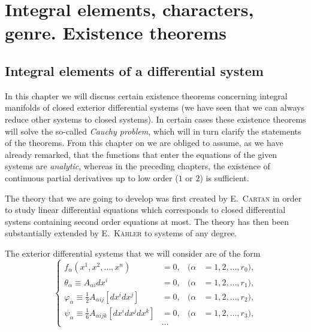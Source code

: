 \chapter{Integral elements, characters, genre. Existence theorems}
\label{cha:integr-elem-char}

\section{Integral elements of a differential system}
\label{sec:integr-elem-diff}

\fsec In this chapter we will discuss certain existence theorems concerning  integral manifolds of closed exterior differential systems (we have seen that we can always reduce other systems to closed systems). In certain cases these existence theorems will solve the so-called \emph{Cauchy problem}, which will in turn clarify the statements of the theorems. From this chapter on we are obliged to assume, as we have already remarked, that the functions that enter the equations of the given systems are \emph{analytic}, whereas in the preceding chapters,  the existence of continuous partial derivatives up to low order ($1$ or $2$) is sufficient.

The theory that we are going to develop was first created by \textsc{E.~Cartan} in order to study linear differential equations which corresponds to closed differential systens containing second order equations at most. The theory has then been substantially extended by \textsc{E.~K\"ahler} to systems of any degree.




\vspace{12pt}\fsec The exterior differential systems that we will consider are of the form
\begin{equation}
  \label{eq:4.1}
  \left\{
    \begin{aligned}
      f_{\alpha}(x^{1},x^{2},\dots,x^{n})&=0,&(\alpha&=1,2,\dots,r_{0}),\\
      \theta_{\alpha}\equiv A_{\alpha i}dx^{i}&=0,&(\alpha&=1,2,\dots,r_{1}),\\
      \varphi_{\alpha}\equiv\frac{1}{2}A_{\alpha ij}[dx^{i}dx^{j}]&=0,&(\alpha&=1,2,\dots,r_{2}),\\
      \psi_{\alpha}\equiv\frac{1}{6}A_{\alpha ijk}[dx^{i}dx^{j}dx^{k}]&=0,&(\alpha&=1,2,\dots,r_{3}),\\
      &\hdots
    \end{aligned}
  \right.
\end{equation}

